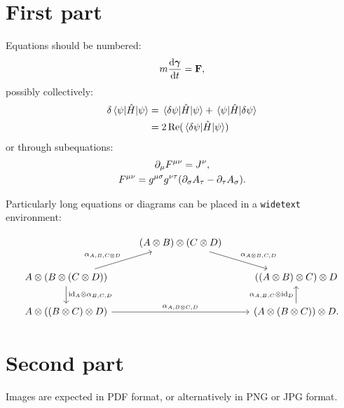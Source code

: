 \documentclass[
 reprint,
 preprintnumbers,
 nobibnotes,
 nofootinbib,
 longbibliography,
 amsmath,amssymb,
 aps,pra
]{revtex4-2}
\begin{document}
\section{First part}

Equations should be numbered:
\begin{equation}
    m \dv{\bm\gamma}{t} = \mathbf{F} ,
\end{equation}
possibly collectively:
\begin{equation}
\begin{split}
    \delta \expval{\hat{H}}{\psi} &= \mel{\delta \psi}{\hat{H}}{\psi} + \mel{\psi}{\hat{H}}{\delta \psi} \\
    &= 2 \Re(\mel{\delta \psi}{\hat{H}}{\psi})
\end{split}
\end{equation}
or through subequations:
\begin{subequations}
\begin{gather}
    \partial_\mu F^{\mu\nu} = J^\nu, \\
    F^{\mu\nu} = g^{\mu\sigma} g^{\nu\tau} \pqty{ \partial_\sigma A_\tau - \partial_\tau A_\sigma }.
\end{gather}
\end{subequations}

Particularly long equations or diagrams can be placed in a \verb|widetext| environment:
\begin{widetext}
\begin{equation}
\begin{tikzcd}
    & (A \otimes B) \otimes (C \otimes D) \arrow[dr, "\alpha_{A \otimes B,C,D}"] & \\
    A \otimes (B \otimes (C \otimes D)) \arrow[ur, "\alpha_{A,B,C \otimes D}"] \arrow[d, "{\rm id}_A \otimes \alpha_{B,C,D}"] & & ((A \otimes B) \otimes C) \otimes D \\
    A \otimes ((B \otimes C) \otimes D) \arrow[rr, "\alpha_{A,B \otimes C,D}"] & & (A \otimes (B \otimes C)) \otimes D \arrow[u, "\alpha_{A,B,C} \otimes {\rm id}_D"].
\end{tikzcd}
\end{equation}
\end{widetext}

\section{Second part}

Images are expected in PDF format, or alternatively in PNG or JPG format.
\end{document}

